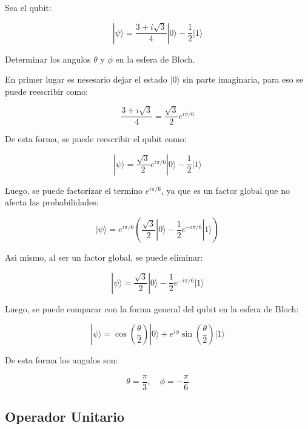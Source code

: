 \documentclass[11pt]{article}
\begin{document}
Sea el qubit:

\begin{equation}
    |\psi\rangle = \frac{3 + i\sqrt{3}}{4} |0\rangle - \frac{1}{2} |1\rangle
\end{equation}

Determinar los angulos $\theta$ y $\phi$ en la esfera de Bloch.

En primer lugar es nesesario dejar el estado $|0\rangle$ sin parte imaginaria, para eso se puede reescribir como:

\begin{equation}
    \frac{3 + i\sqrt{3}}{4} = \frac{\sqrt{3}}{2} e^{i\pi/6}
\end{equation}

De esta forma, se puede reescribir el qubit como:

\begin{equation}
    |\psi\rangle = \frac{\sqrt{3}}{2} e^{i\pi/6} |0\rangle - \frac{1}{2} |1\rangle
\end{equation}

Luego, se puede factorizar el termino $e^{i\pi/6}$, ya que es un factor global que no afecta las probabilidades:

\begin{equation}
    |\psi\rangle = e^{i\pi/6} \left( \frac{\sqrt{3}}{2} |0\rangle - \frac{1}{2} e^{-i\pi/6} |1\rangle \right)
\end{equation}

Asi mismo, al ser un factor global, se puede eliminar:

\begin{equation}
    |\psi\rangle = \frac{\sqrt{3}}{2} |0\rangle - \frac{1}{2} e^{-i\pi/6} |1\rangle
\end{equation}

Luego, se puede comparar con la forma general del qubit en la esfera de Bloch:

\begin{equation}
    |\psi\rangle = \cos\left(\frac{\theta}{2}\right) |0\rangle + e^{i\phi} \sin\left(\frac{\theta}{2}\right) |1\rangle
\end{equation}

De esta forma los angulos son:

\begin{equation}
    \theta = \frac{\pi}{3}, \quad \phi = -\frac{\pi}{6}
\end{equation}

\subsection{Operador Unitario}
\end{document}
